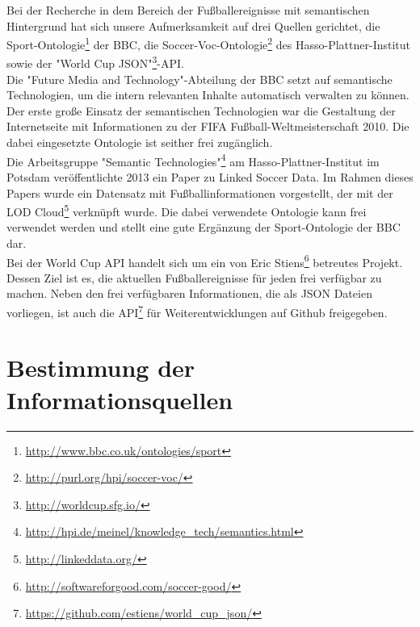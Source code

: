 \documentclass[runningheads,a4paper]{llncs}
\begin{document}
Bei der Recherche in dem Bereich der Fußballereignisse mit semantischen Hintergrund hat sich unsere Aufmerksamkeit auf drei Quellen gerichtet, die Sport-Ontologie\footnote{\url{http://www.bbc.co.uk/ontologies/sport}} der BBC, die Soccer-Voc-Ontologie\footnote{\url{http://purl.org/hpi/soccer-voc/}} des Hasso-Plattner-Institut sowie der "World Cup JSON"{}\footnote{\url{http://worldcup.sfg.io/}}-API.\\ Die "Future Media and Technology"{}-Abteilung der BBC setzt auf semantische Technologien, um die intern relevanten Inhalte automatisch verwalten zu können. Der erste große Einsatz der semantischen Technologien war die Gestaltung der Internetseite\cite{url_bbc} mit Informationen zu der FIFA Fußball-Weltmeisterschaft 2010. Die dabei eingesetzte Ontologie ist seither frei zugänglich. \\
Die Arbeitsgruppe "{}Semantic Technologies"{}\footnote{\url{http://hpi.de/meinel/knowledge_tech/semantics.html}} am Hasso-Plattner-Institut im Potsdam veröffentlichte 2013 ein Paper zu Linked Soccer Data\cite{url_lsd}. Im Rahmen dieses Papers wurde ein Datensatz mit Fußballinformationen vorgestellt, der mit der LOD Cloud\footnote{\url{http://linkeddata.org/}} verknüpft wurde. Die dabei verwendete Ontologie kann frei verwendet werden und stellt eine gute Ergänzung der Sport-Ontologie der BBC dar.\\
Bei der World Cup API handelt sich um ein von Eric Stiens\footnote{\url{http://softwareforgood.com/soccer-good/}} betreutes Projekt. Dessen Ziel ist es, die aktuellen Fußballereignisse für jeden frei verfügbar zu machen. Neben den frei verfügbaren Informationen, die als JSON Dateien vorliegen, ist auch die API\footnote{\url{https://github.com/estiens/world_cup_json/}} für Weiterentwicklungen auf Github freigegeben. 


\section{Bestimmung der Informationsquellen}\label{infoQuell}
\end{document}
